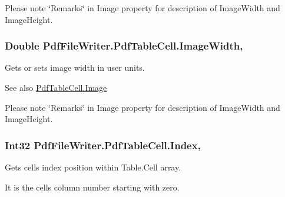 Please note \char`\"{}\+Remarks\char`\"{} in Image property for description of Image\+Width and Image\+Height. 
\subsubsection[{\texorpdfstring{Image\+Width}{ImageWidth}}]{\setlength{\rightskip}{0pt plus 5cm}Double Pdf\+File\+Writer.\+Pdf\+Table\+Cell.\+Image\+Width\hspace{0.3cm}{\ttfamily [get]}, {\ttfamily [set]}}\hypertarget{class_pdf_file_writer_1_1_pdf_table_cell_a6d35c2558eba3fdd14e70bf88bae3624}{}\label{class_pdf_file_writer_1_1_pdf_table_cell_a6d35c2558eba3fdd14e70bf88bae3624}


Gets or sets image width in user units. 

\begin{DoxySeeAlso}{See also}
\hyperlink{class_pdf_file_writer_1_1_pdf_table_cell_aae3e2b72c4d9cee9b656abdff40b13b8}{Pdf\+Table\+Cell.\+Image}


\end{DoxySeeAlso}


Please note \char`\"{}\+Remarks\char`\"{} in Image property for description of Image\+Width and Image\+Height. 
\subsubsection[{\texorpdfstring{Index}{Index}}]{\setlength{\rightskip}{0pt plus 5cm}Int32 Pdf\+File\+Writer.\+Pdf\+Table\+Cell.\+Index\hspace{0.3cm}{\ttfamily [get]}, {\ttfamily [set]}}\hypertarget{class_pdf_file_writer_1_1_pdf_table_cell_a2986ee3dac40f0fb77f3e4e7c178687b}{}\label{class_pdf_file_writer_1_1_pdf_table_cell_a2986ee3dac40f0fb77f3e4e7c178687b}


Gets cell\textquotesingle{}s index position within Table.\+Cell array. 

It is the cell\textquotesingle{}s column number starting with zero. 
